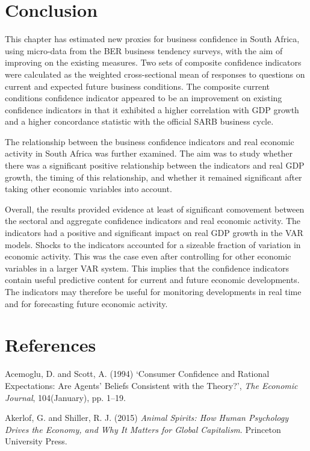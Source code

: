 \documentclass[11pt,]{article}
\begin{document}
\section{Conclusion}\label{conclusion}

This chapter has estimated new proxies for business confidence in South
Africa, using micro-data from the BER business tendency surveys, with
the aim of improving on the existing measures. Two sets of composite
confidence indicators were calculated as the weighted cross-sectional
mean of responses to questions on current and expected future business
conditions. The composite current conditions confidence indicator
appeared to be an improvement on existing confidence indicators in that
it exhibited a higher correlation with GDP growth and a higher
concordance statistic with the official SARB business cycle.

The relationship between the business confidence indicators and real
economic activity in South Africa was further examined. The aim was to
study whether there was a significant positive relationship between the
indicators and real GDP growth, the timing of this relationship, and
whether it remained significant after taking other economic variables
into account.

Overall, the results provided evidence at least of significant
comovement between the sectoral and aggregate confidence indicators and
real economic activity. The indicators had a positive and significant
impact on real GDP growth in the VAR models. Shocks to the indicators
accounted for a sizeable fraction of variation in economic activity.
This was the case even after controlling for other economic variables in
a larger VAR system. This implies that the confidence indicators contain
useful predictive content for current and future economic developments.
The indicators may therefore be useful for monitoring developments in
real time and for forecasting future economic activity.

\section*{References}\label{references}

\hypertarget{refs}{}
\hypertarget{ref-Acemoglu1994}{}
Acemoglu, D. and Scott, A. (1994) `Consumer Confidence and Rational
Expectations: Are Agents' Beliefs Consistent with the Theory?',
\emph{The Economic Journal}, 104(January), pp. 1--19.

\hypertarget{ref-Akerlof2015}{}
Akerlof, G. and Shiller, R. J. (2015) \emph{Animal Spirits: How Human
Psychology Drives the Economy, and Why It Matters for Global
Capitalism}. Princeton University Press.
\end{document}
